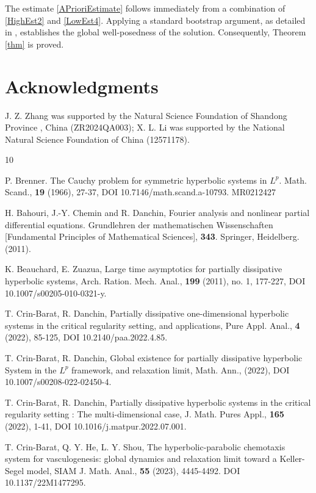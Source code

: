 \documentclass{amsart}
\theoremstyle{definition}
\theoremstyle{remark}
\numberwithin{equation}{section}
\begin{document}
The estimate \eqref{APrioriEstimate} follows immediately from a combination of \eqref{HighEst2} and \eqref{LowEst4}. Applying a standard bootstrap argument, as detailed in \cite{BShouZhang}, establishes the global well-posedness of the solution. Consequently, Theorem \ref{thm} is proved.






\section*{Acknowledgments}
J. Z. Zhang was supported by the Natural Science Foundation of Shandong Province , China (ZR2024QA003); X. L. Li was supported by the National
Natural Science Foundation of China (12571178).



\begin{thebibliography}{10}


P. Brenner. The Cauchy problem for symmetric hyperbolic systems in $L^p$. Math. Scand., {\bf 19} (1966), 27-37, DOI 10.7146/math.scand.a-10793. MR0212427

H. Bahouri, J.-Y. Chemin and R. Danchin, Fourier analysis and nonlinear partial differential equations. Grundlehren der mathematischen Wissenschaften [Fundamental Principles of Mathematical Sciences], {\bf 343}. Springer, Heidelberg. (2011).

K. Beauchard, E. Zuazua, Large time asymptotics for partially dissipative hyperbolic systems, Arch. Ration. Mech. Anal., {\bf 199} (2011), no. 1, 177-227, DOI 10.1007/s00205-010-0321-y.

T. Crin-Barat, R. Danchin, Partially dissipative one-dimensional hyperbolic systems in the critical regularity setting, and applications, Pure Appl. Anal., {\bf 4} (2022), 85-125, DOI 10.2140/paa.2022.4.85.

T. Crin-Barat, R. Danchin, Global existence for partially dissipative hyperbolic System in the $L^p$ framework, and relaxation limit, Math. Ann., (2022), DOI 10.1007/s00208-022-02450-4.

T. Crin-Barat, R. Danchin, Partially dissipative hyperbolic systems in the critical regularity setting : The multi-dimensional case,
J. Math. Pures Appl., {\bf 165} (2022), 1-41, DOI 10.1016/j.matpur.2022.07.001.

T. Crin-Barat, Q. Y. He, L. Y. Shou, The hyperbolic-parabolic chemotaxis system for vasculogenesis: global dynamics and relaxation limit toward a Keller-Segel model, SIAM J. Math. Anal., {\bf 55} (2023), 4445-4492.
DOI 10.1137/22M1477295.


\end{thebibliography}
\end{document}
